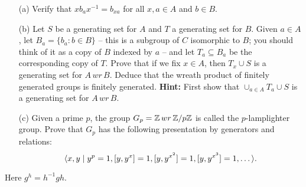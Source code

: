 \documentclass[12pt]{amsart}
\begin{document}
\begin{itemize}
\item[(a)] Verify that $x b_a x^{-1}=b_{xa}$ for all $x,a\in A$ and $b\in B$.
\item[(b)] Let $S$ be a generating set for $A$ and $T$ a generating set for $B$.
Given $a\in A$, let $B_a=\{b_a: b\in B\}$ -- this is a subgroup of $C$ isomorphic to $B$; you should think of it as a copy of $B$
indexed by $a$ -- and let $T_a\subseteq B_a$ be the corresponding copy of $T$. Prove that
if we fix $x\in A$, then $T_x\cup S$ is a generating set for $A\, wr\, B$. Deduce
that the wreath product of finitely generated groups is finitely generated.
{\bf Hint:} First show that $\cup_{a\in A} T_a\cup S$ is a generating set for $A\, wr\, B$.
\item[(c)] Given a prime $p$, the group $G_p={\mathbb Z}\, wr\, {\mathbb Z}/p{\mathbb Z}$ is called the $p$-lamplighter group. Prove that
$G_p$ has the following presentation by generators and relations:
$${\langle} x,y \mid y^p=1, [y,y^x]=1, [y, y^{x^2}]=1, [y, y^{x^3}]=1,\ldots{\rangle}.$$
\end{itemize}
Here $g^h=h^{-1}gh$.
\end{document}

